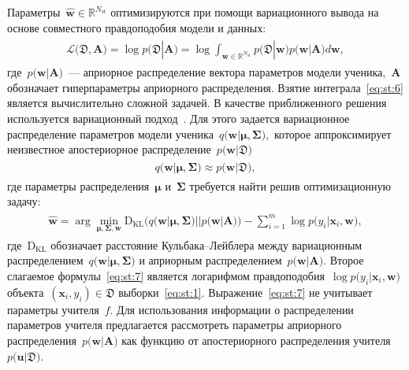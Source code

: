 \documentclass[12pt]{a&t}
\begin{document}
Параметры~$\hat{\mathbf{w}} \in \mathbb{R}^{N_{\text{st}}}$ оптимизируются при помощи вариационного вывода на основе совместного правдоподобия модели и данных:
\begin{gather}
\label{eq:st:6}
\begin{aligned}
\mathcal{L}\bigr(\mathfrak{D}, \mathbf{A}\bigr) = \log p\bigr(\mathfrak{D}|\mathbf{A}\bigr) = \log \int_{\mathbf{w} \in \mathbb{R}^{N_{\text{st}}}}p\bigr(\mathfrak{D}|\mathbf{w}\bigr)p\bigr(\mathbf{w}|\mathbf{A}\bigr)d\mathbf{w},
\end{aligned}
\end{gather}
где~$p\bigr(\mathbf{w}| \mathbf{A}\bigr)$~--- априорное распределение вектора параметров модели ученика,~$\mathbf{A}$ обозначает гиперпараметры априорного распределения.
Взятие интеграла~\eqref{eq:st:6} является вычислительно сложной задачей. В качестве приближенного решения используется вариационный подход~\cite{graves2011, grabovoy2019}. Для этого задается вариационное распределение параметров модели ученика~$q\bigr(\mathbf{w}|\bm{\mu}, \bm{\Sigma}\bigr),$ которое аппроксимирует неизвестное апостериорное распределение~$p\bigr(\mathbf{w}|\mathfrak{D}\bigr)$
\begin{gather}
\label{eq:st:new:1}
\begin{aligned}
q\bigr(\mathbf{w}|\bm{\mu}, \bm{\Sigma}\bigr) \approx  p\bigr(\mathbf{w}|\mathfrak{D}\bigr),
\end{aligned}
\end{gather}
где параметры распределения~$\bm{\mu}$ и~$\bm{\Sigma}$ требуется найти решив оптимизационную задачу:
\begin{gather}
\label{eq:st:7}
\begin{aligned}
\hat{\mathbf{w}} = \arg \min_{\bm{\mu}, \bm{\Sigma}, \mathbf{w}} \text{D}_{\text{KL}}\bigr(q\bigr(\mathbf{w}|\bm{\mu}, \bm{\Sigma}\bigr)||p\bigr(\mathbf{w}|\mathbf{A}\bigr)\bigr) - \sum_{i=1}^{m}\log p\bigr(y_i|\mathbf{x}_{i}, \mathbf{w}\bigr),
\end{aligned}
\end{gather}
где~$\text{D}_{\text{KL}}$ обозначает расстояние Кульбака--Лейблера между вариационным распределением~$q\bigr(\mathbf{w}|\bm{\mu}, \bm{\Sigma}\bigr)$ и априорным распределением~$p\bigr(\mathbf{w}|\mathbf{A}\bigr).$ Второе слагаемое формулы~\eqref{eq:st:7} является логарифмом правдоподобия~$\log p\bigr(y_i|\mathbf{x}_{i}, \mathbf{w}\bigr)$ объекта~$\left(\mathbf{x}_i, y_i\right) \in \mathfrak{D}$ выборки~\eqref{eq:st:1}.
Выражение~\eqref{eq:st:7} не учитывает параметры учителя~$f$. Для использования информации о распределении параметров учителя предлагается рассмотреть параметры априорного распределения~$p\bigr(\mathbf{w}|\mathbf{A}\bigr)$ как функцию от апостериорного распределения учителя~$p\bigr(\mathbf{u}|\mathfrak{D}\bigr)$.
\end{document}
